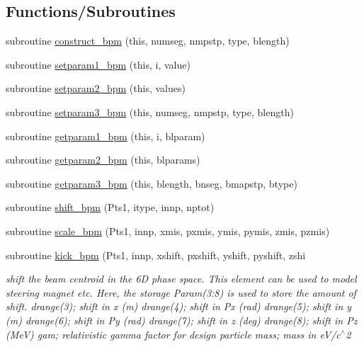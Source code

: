 \subsection*{Functions/\+Subroutines}
\begin{DoxyCompactItemize}
\item 
subroutine \mbox{\hyperlink{namespacebpmclass_a777700e03d6422437747b159baf8ac47}{construct\+\_\+bpm}} (this, numseg, nmpstp, type, blength)
\item 
subroutine \mbox{\hyperlink{namespacebpmclass_ac6cf17939baa6ee32b20af627036c73e}{setparam1\+\_\+bpm}} (this, i, value)
\item 
subroutine \mbox{\hyperlink{namespacebpmclass_a37f4e426713e3624ee853c1343294cab}{setparam2\+\_\+bpm}} (this, values)
\item 
subroutine \mbox{\hyperlink{namespacebpmclass_a75a67023bf7f429ccd2ef12a435077a7}{setparam3\+\_\+bpm}} (this, numseg, nmpstp, type, blength)
\item 
subroutine \mbox{\hyperlink{namespacebpmclass_ac5588f058f6a85c7c6c131ca7172065d}{getparam1\+\_\+bpm}} (this, i, blparam)
\item 
subroutine \mbox{\hyperlink{namespacebpmclass_ae88ec9feb4f283a3914a0859b14dc8dc}{getparam2\+\_\+bpm}} (this, blparams)
\item 
subroutine \mbox{\hyperlink{namespacebpmclass_a290f2f59ee0b68d7f56e678b87f43393}{getparam3\+\_\+bpm}} (this, blength, bnseg, bmapstp, btype)
\item 
subroutine \mbox{\hyperlink{namespacebpmclass_af08cf75c879f797ae8f03ba69e95d628}{shift\+\_\+bpm}} (Pts1, itype, innp, nptot)
\item 
subroutine \mbox{\hyperlink{namespacebpmclass_a2260a4affb3b3dc90db1d734a5e73b11}{scale\+\_\+bpm}} (Pts1, innp, xmis, pxmis, ymis, pymis, zmis, pzmis)
\item 
subroutine \mbox{\hyperlink{namespacebpmclass_a5c6269e3b899045a35e2bda31ac57c9b}{kick\+\_\+bpm}} (Pts1, innp, xshift, pxshift, yshift, pyshift, zshi
\begin{DoxyCompactList}\small\item\em shift the beam centroid in the 6D phase space. This element can be used to model steering magnet etc. Here, the storage Param(3\+:8) is used to store the amount of shift. drange(3); shift in x (m) drange(4); shift in Px (rad) drange(5); shift in y (m) drange(6); shift in Py (rad) drange(7); shift in z (deg) drange(8); shift in Pz (MeV) gam; relativistic gamma factor for design particle mass; mass in e\+V/c$^\wedge$2 \end{DoxyCompactList}\item 

\end{DoxyCompactItemize}
